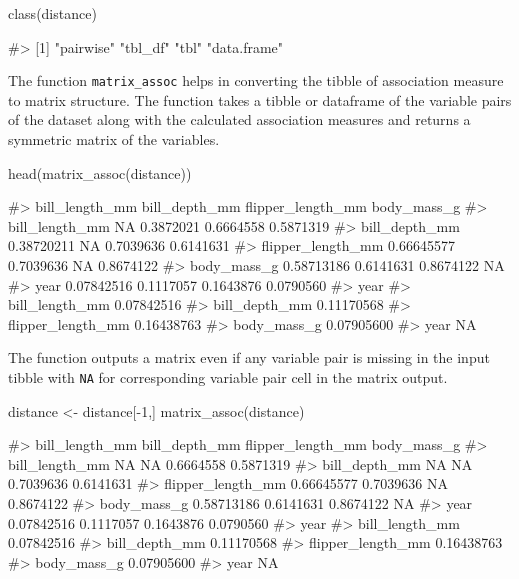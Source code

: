 \begin{Schunk}
\begin{Sinput}
class(distance)
\end{Sinput}
\begin{Soutput}
#> [1] "pairwise"   "tbl_df"     "tbl"        "data.frame"
\end{Soutput}
\end{Schunk}

The function \texttt{matrix\_assoc} helps in converting the tibble of
association measure to matrix structure. The function takes a tibble or
dataframe of the variable pairs of the dataset along with the calculated
association measures and returns a symmetric matrix of the variables.

\begin{Schunk}
\begin{Sinput}
head(matrix_assoc(distance))
\end{Sinput}
\begin{Soutput}
#>                   bill_length_mm bill_depth_mm flipper_length_mm body_mass_g
#> bill_length_mm                NA     0.3872021         0.6664558   0.5871319
#> bill_depth_mm         0.38720211            NA         0.7039636   0.6141631
#> flipper_length_mm     0.66645577     0.7039636                NA   0.8674122
#> body_mass_g           0.58713186     0.6141631         0.8674122          NA
#> year                  0.07842516     0.1117057         0.1643876   0.0790560
#>                         year
#> bill_length_mm    0.07842516
#> bill_depth_mm     0.11170568
#> flipper_length_mm 0.16438763
#> body_mass_g       0.07905600
#> year                      NA
\end{Soutput}
\end{Schunk}

The function outputs a matrix even if any variable pair is missing in
the input tibble with \texttt{NA} for corresponding variable pair cell
in the matrix output.

\begin{Schunk}
\begin{Sinput}
distance <- distance[-1,]
matrix_assoc(distance)
\end{Sinput}
\begin{Soutput}
#>                   bill_length_mm bill_depth_mm flipper_length_mm body_mass_g
#> bill_length_mm                NA            NA         0.6664558   0.5871319
#> bill_depth_mm                 NA            NA         0.7039636   0.6141631
#> flipper_length_mm     0.66645577     0.7039636                NA   0.8674122
#> body_mass_g           0.58713186     0.6141631         0.8674122          NA
#> year                  0.07842516     0.1117057         0.1643876   0.0790560
#>                         year
#> bill_length_mm    0.07842516
#> bill_depth_mm     0.11170568
#> flipper_length_mm 0.16438763
#> body_mass_g       0.07905600
#> year                      NA
\end{Soutput}
\end{Schunk}

